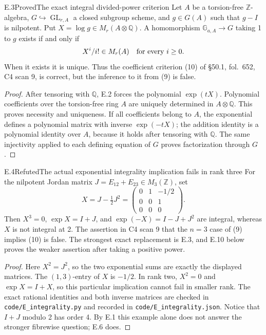 \begin{statement}{E.3}{Proved}{The exact integral divided-power criterion}
Let \(A\) be a torsion-free \(\mathbb Z\)-algebra,
\(G\hookrightarrow\operatorname{GL}_{r,A}\) a closed subgroup scheme,
and \(g\in G(A)\) such that \(g-I\) is nilpotent.  Put
\(X=\log g\in M_r(A\otimes\mathbb Q)\).  A homomorphism
\(\mathbb G_{a,A}\to G\) taking 1 to \(g\) exists if and only if
\[
                  X^i/i!\in M_r(A)\quad\hbox{for every }i\geq 0.
\]
When it exists it is unique.  Thus the coefficient criterion (10) of
\S50.1, fol.~652, C4 scan 9, is correct, but the inference to it from
(9) is false.
\end{statement}
\begin{proof}
After tensoring with \(\mathbb Q\), E.2 forces the polynomial
\(\exp(tX)\).  Polynomial coefficients over the torsion-free ring \(A\)
are uniquely determined in \(A\otimes\mathbb Q\).  This proves
necessity and uniqueness.  If all coefficients belong to \(A\), the
exponential defines a polynomial matrix with inverse \(\exp(-tX)\);
the addition identity is a polynomial identity over \(A\), because it
holds after tensoring with \(\mathbb Q\).  The same injectivity applied
to each defining equation of \(G\) proves factorization through \(G\).
\end{proof}

\begin{statement}{E.4}{Refuted}{The actual exponential integrality implication fails in rank three}
For the nilpotent Jordan matrix \(J=E_{12}+E_{23}\in M_3(\mathbb Z)\), set
\[
 X=J-\tfrac12J^2
   =\begin{pmatrix}0&1&-1/2\\0&0&1\\0&0&0\end{pmatrix}.
\]
Then \(X^3=0\), \(\exp X=I+J\), and
\(\exp(-X)=I-J+J^2\) are integral, whereas \(X\) is not integral at 2.
The assertion in C4 scan 9 that the \(n=3\) case of (9) implies (10)
is false.  The strongest exact replacement is E.3, and E.10 below
proves the weaker assertion after taking a positive power.
\end{statement}
\begin{proof}
Here \(X^2=J^2\), so the two exponential sums are exactly the displayed
matrices.  The \((1,3)\)-entry of \(X\) is \(-1/2\).  In rank two,
\(X^2=0\) and \(\exp X=I+X\), so this particular implication cannot
fail in smaller rank.  The exact rational identities and both inverse
matrices are checked in \texttt{code/E\_integrality.py} and recorded in
\texttt{code/E\_integrality.json}.  Notice that \(I+J\) modulo 2 has
order 4.  By E.1 this example alone does not answer the stronger
fibrewise question; E.6 does.
\end{proof}

